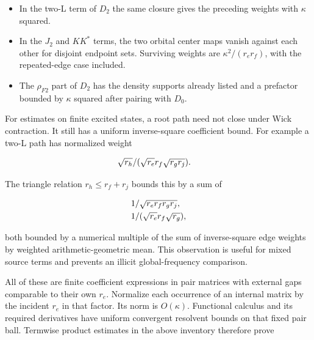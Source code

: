 \begin{itemize}
  In \(D_{0}^{*}F^{-1}L^{*}F^{-1} N_{Y}^{*}p_{F}\), nonzero Wick
  contractions force the second root path to close the same triangle.
  The two possible pairings have weights \(\kappa /(r_{f} r_{g})\) and
  \(\kappa /(r_{e} r_{f})\).
\item
  In the two-L term of \(D_{2}\) the same closure gives the preceding
  weights with \(\kappa\) squared.
\item
  In the \(J_{2}\) and \(KK^{*}\) terms, the two orbital center maps
  vanish against each other for disjoint endpoint sets. Surviving
  weights are \(\kappa ^{2}/(r_{e} r_{f})\), with the repeated-edge case
  included.
\item
  The \(\rho _{F2}\) part of \(D_{2}\) has the density supports already
  listed and a prefactor bounded by \(\kappa\) squared after pairing
  with \(D_{0}\).
\end{itemize}

For estimates on finite excited states, a root path need not close under
Wick contraction. It still has a uniform inverse-square coefficient
bound. For example a two-L path has normalized weight

\begin{gather*}
\begin{aligned}
& \sqrt{r_{h}}/(\sqrt{r_{e}} r_{f} \sqrt{r_{g} r_{j}}).
\end{aligned}\notag
\end{gather*}

The triangle relation \(r_{h}\le r_{f}+r_{j}\) bounds this by a sum of

\begin{gather*}
\begin{aligned}
& 1/\sqrt{r_{e} r_{f} r_{g} r_{j}}, \\
& 1/(\sqrt{r_{e}} r_{f} \sqrt{r_{g}}),
\end{aligned}\notag
\end{gather*}

both bounded by a numerical multiple of the sum of inverse-square edge
weights by weighted arithmetic-geometric mean. This observation is
useful for mixed source terms and prevents an illicit global-frequency
comparison.

All of these are finite coefficient expressions in pair matrices with
external gaps comparable to their own \(r_{e}\). Normalize each
occurrence of an internal matrix by the incident \(r_{e}\) in that
factor. Its norm is \(O(\kappa )\). Functional calculus and its required
derivatives have uniform convergent resolvent bounds on that fixed pair
ball. Termwise product estimates in the above inventory therefore prove

